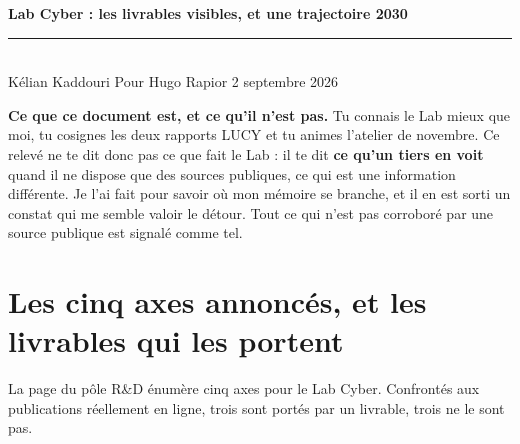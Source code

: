 \documentclass[11pt,a4paper]{article}
\begin{document}
\small

{\Large\bfseries\color{bleu} Lab Cyber : les livrables visibles, et une trajectoire 2030}\\[3pt]
{\color{accent}\rule{\textwidth}{1.1pt}}\\[3pt]
{\footnotesize Kélian Kaddouri \hfill Pour Hugo Rapior \textbullet{} 2 septembre 2026}

\vspace{6pt}

\noindent\textbf{Ce que ce document est, et ce qu'il n'est pas.} Tu connais le Lab mieux que
moi, tu cosignes les deux rapports LUCY et tu animes l'atelier de novembre. Ce relevé ne te dit
donc pas ce que fait le Lab : il te dit \textbf{ce qu'un tiers en voit} quand il ne dispose que
des sources publiques, ce qui est une information différente. Je l'ai fait pour savoir où mon
mémoire se branche, et il en est sorti un constat qui me semble valoir le détour. Tout ce qui
n'est pas corroboré par une source publique est signalé comme tel.

\section{Les cinq axes annoncés, et les livrables qui les portent}

La page du pôle R\&D énumère cinq axes pour le Lab Cyber. Confrontés aux publications
réellement en ligne, trois sont portés par un livrable, trois ne le sont pas.
\end{document}
